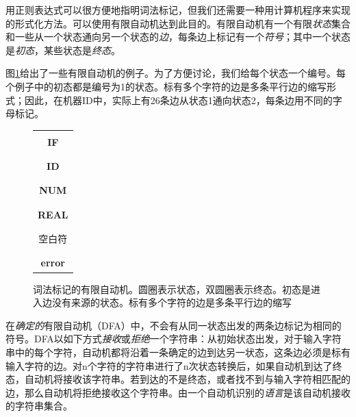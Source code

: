 \documentclass[cn,11pt,chinese]{elegantbook}
\begin{document}
用正则表达式可以很方便地指明词法标记，但我们还需要一种用计算机程序来实现的形式化方法。可以使用有限自动机达到此目的。有限自动机有一个有限\textit{状态}集合和一些从一个状态通向另一个状态的\textit{边}，每条边上标记有一个\textit{符号}；其中一个状态是\textit{初态}，某些状态是\textit{终态}。

图\ref{fig:2-3}给出了一些有限自动机的例子。为了方便讨论，我们给每个状态一个编号。每个例子中的初态都是编号为1的状态。标有多个字符的边是多条平行边的缩写形式；因此，在机器ID中，实际上有26条边从状态1通向状态2，每条边用不同的字母标记。

\begin{figure}[htbp]
  \centering
  \begin{tabular}{c}
    {
      \fontsize{8pt}{9.6pt}\selectfont
      
    } \\
  \textbf{IF} \\\\
    {
      \fontsize{8pt}{9.6pt}\selectfont
      
    } \\
  \textbf{ID} \\\\
    {
      \fontsize{8pt}{9.6pt}\selectfont
      
    } \\
  \textbf{NUM} \\\\
    {
      \fontsize{8pt}{9.6pt}\selectfont
      
    } \\
  \textbf{REAL} \\\\
    {
      \fontsize{8pt}{9.6pt}\selectfont
      
    } \\
  空白符 \\\\
    {
      \fontsize{8pt}{9.6pt}\selectfont
      
    } \\
  \textbf{error}
  \end{tabular}
  \caption{词法标记的有限自动机。圆圈表示状态，双圆圈表示终态。初态是进入边没有来源的状态。标有多个字符的边是多条平行边的缩写}
  \label{fig:2-3}
\end{figure}

在\textit{确定的}有限自动机（DFA）中，不会有从同一状态出发的两条边标记为相同的符号。DFA以如下方式\textit{接收}或\textit{拒绝}一个字符串：从初始状态出发，对于输入字符串中的每个字符，自动机都将沿着一条确定的边到达另一状态，这条边必须是标有输入字符的边。对n个字符的字符串进行了n次状态转换后，如果自动机到达了终态，自动机将接收该字符串。若到达的不是终态，或者找不到与输入字符相匹配的边，那么自动机将拒绝接收这个字符串。由一个自动机识别的\textit{语言}是该自动机接收的字符串集合。
\end{document}
